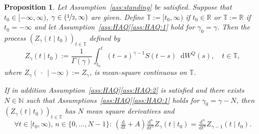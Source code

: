 \documentclass[reqno]{amsart}
\numberwithin{equation}{section}
\newcommand{\bbT}{\mathbb{T}}
\newcommand{\R}{\mathbb{R}}
\newcommand{\N}{\mathbb{N}}
\newcommand{\rd}{\mathop{}\!\mathrm{d}}
\newtheorem{proposition}[lemma]{Proposition}
\theoremstyle{remark}
\theoremstyle{definition}
\begin{document}
\begin{proposition}\label{prop:Zgamma-diffbty}
	Let Assumption~\textup{\ref{ass:standing}} be satisfied.
	Suppose that $t_0 \in [-\infty, \infty)$, $\gamma \in (\nicefrac{1}{2}, \infty)$ 
	are given.
	Define $\bbT := [t_0, \infty)$ if $t_0 \in \R$ or $\bbT := \R$ if $t_0 = -\infty$
	and let
	Assumption~\textup{\ref{ass:HAQ}\ref{ass:HAQ:1}} hold
	for $\gamma_0 = \gamma$. Then the process $(Z_{\gamma}(t \mid t_0))_{t \in \bbT}$ defined by
	\begin{equation}\label{eq:Zgamma-t-t0}
		Z_{\gamma}(t \mid t_0) := \frac{1}{\Gamma(\gamma)}\int_{t_0}^t (t-s)^{\gamma-1} S(t-s) \rd W^Q(s), 
		\quad 
		t \in \bbT,
	\end{equation}
	where $Z_\gamma(\,\cdot\, \mid -\infty) := Z_\gamma$, is mean-square continuous on $\bbT$.
	
	If in addition Assumption~\textup{\ref{ass:HAQ}\ref{ass:HAQ:2}} is satisfied and there exists $N \in \N$ 
	such that Assumptions~\textup{\ref{ass:HAQ}\ref{ass:HAQ:1}} holds
	for $\gamma_0 = \gamma - N$, 
	then $(Z_{\gamma}(t \mid t_0))_{t\in \bbT}$ has $N$ mean square derivatives and
	\begin{equation}\label{eq:recurrence-Zint}
		\forall t \in [t_0, \infty), \, n \in \{0,\dots,N-1\} \colon \: 
		\left(\tfrac{\mathrm d}{\mathrm dt} + A\right)
		\tfrac{\mathrm d^n}{\mathrm dt^n}
		Z_{\gamma}(t \mid t_0) 
		= 
		\tfrac{\mathrm d^n}{\mathrm dt^n}
		Z_{\gamma-1}(t \mid t_0).
	\end{equation}
\end{proposition}
\end{document}
